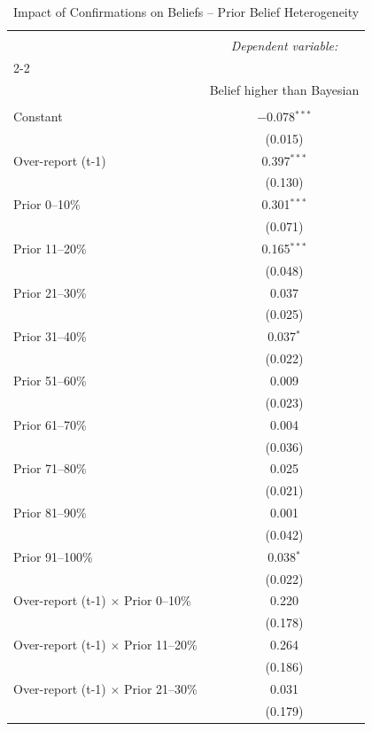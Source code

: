 
\begin{table}[!htbp] \centering 
  \caption{Impact of Confirmations on Beliefs -- Prior Belief Heterogeneity} 
  \label{} 
\begin{tabular}{@{\extracolsep{5pt}}lc} 
\\[-1.8ex]\hline 
\hline \\[-1.8ex] 
 & \multicolumn{1}{c}{\textit{Dependent variable:}} \\ 
\cline{2-2} 
\\[-1.8ex] & Belief higher than Bayesian \\ 
\hline \\[-1.8ex] 
 Constant & $-$0.078$^{***}$ \\ 
  & (0.015) \\ 
  Over-report (t-1) & 0.397$^{***}$ \\ 
  & (0.130) \\ 
  Prior 0--10\% & 0.301$^{***}$ \\ 
  & (0.071) \\ 
  Prior 11--20\% & 0.165$^{***}$ \\ 
  & (0.048) \\ 
  Prior 21--30\% & 0.037 \\ 
  & (0.025) \\ 
  Prior 31--40\% & 0.037$^{*}$ \\ 
  & (0.022) \\ 
  Prior 51--60\% & 0.009 \\ 
  & (0.023) \\ 
  Prior 61--70\% & 0.004 \\ 
  & (0.036) \\ 
  Prior 71--80\% & 0.025 \\ 
  & (0.021) \\ 
  Prior 81--90\% & 0.001 \\ 
  & (0.042) \\ 
  Prior 91--100\% & 0.038$^{*}$ \\ 
  & (0.022) \\ 
  Over-report (t-1) $\times$ Prior 0--10\% & 0.220 \\ 
  & (0.178) \\ 
  Over-report (t-1) $\times$ Prior 11--20\% & 0.264 \\ 
  & (0.186) \\ 
  Over-report (t-1) $\times$ Prior 21--30\% & 0.031 \\ 
  & (0.179) \\ 

\end{tabular}
\end{table}
